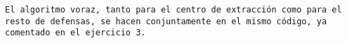 \begin{lstlisting}
El algoritmo voraz, tanto para el centro de extracción como para el resto de defensas, se hacen conjuntamente en el mismo código, ya comentado en el ejercicio 3.
\end{lstlisting}
